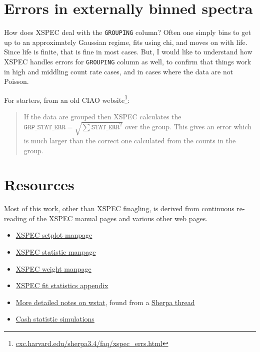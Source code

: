 \documentclass[onecolumn,tighten]{aastex6}
\newcommand*{\code}{\texttt}
\begin{document}
\section{Errors in externally binned spectra}


How does XSPEC deal with the \code{GROUPING} column?
Often one simply bins to get up to an approximately Gaussian regime, fits using
chi, and moves on with life.
Since life is finite, that is fine in most cases.
But, I would like to understand how XSPEC handles errors for \code{GROUPING} column as
well, to confirm that things work in high and middling count rate cases, and in
cases where the data are not Poisson.

For starters, from an old CIAO website\footnote{\href{http://cxc.harvard.edu/sherpa3.4/faq/xspec_errs.html}{cxc.harvard.edu/sherpa3.4/faq/xspec\_errs.html}}:
\begin{quote}
If the data are grouped then XSPEC calculates the
$\code{GRP\_STAT\_ERR} = \sqrt{\sum \code{STAT\_ERR}^2}$ over the group.
This gives an error which is much larger than the correct one calculated from
the counts in the group.
\end{quote}

\section{Resources}

Most of this work, other than XSPEC finagling, is derived from continuous
re-reading of the XSPEC manual pages and various other web pages.

\begin{itemize}
    \item \href{http://heasarc.gsfc.nasa.gov/docs/xanadu/xspec/manual/XSsetplot.html}{XSPEC setplot manpage}
    \item \href{http://heasarc.gsfc.nasa.gov/docs/xanadu/xspec/manual/XSstatistic.html}{XSPEC statistic manpage}
    \item \href{http://heasarc.gsfc.nasa.gov/docs/xanadu/xspec/manual/XSweight.html}{XSPEC weight manpage}
    \item \href{http://heasarc.gsfc.nasa.gov/docs/xanadu/xspec/manual/XSappendixStatistics.html}{XSPEC fit statistics appendix}
    \item \href{http://heasarc.gsfc.nasa.gov/docs/xanadu/xspec/wstat.ps}{More
        detailed notes on wstat}, found from a \href{https://github.com/sherpa/sherpa/pull/94}{Sherpa thread}
    \item \href{http://hesperia.gsfc.nasa.gov/~schmahl/cash/cash_oddities.html}{Cash statistic simulations}
\end{itemize}
\end{document}
